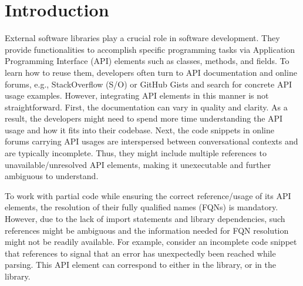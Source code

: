 \section{Introduction}
\label{sec:intro}

External software libraries play a crucial role in software development. They provide functionalities to accomplish specific programming tasks via Application Programming Interface (API) elements such as classes, methods, and fields. To learn how to reuse them, developers often turn to API documentation and online forums, e.g., StackOverflow (S/O) or GitHub Gists and search for concrete API usage examples. However, integrating API elements in this manner is not straightforward. First, the documentation can vary in quality and clarity. As a result, the developers might need to spend more time understanding the API usage and how it fits into their codebase. Next, the code snippets in online forums carrying API usages are interspersed between conversational contexts and are typically incomplete. Thus, they might include multiple references to unavailable/unresolved API elements, making it unexecutable and further ambiguous to understand.

To work with partial code while ensuring the correct reference/usage of its API elements, the resolution of their fully qualified names (FQNs) is mandatory. However, due to the lack of import statements and library dependencies, such references might be ambiguous and the information needed for FQN resolution might not be readily available. For example, consider an incomplete code snippet that references  to signal that an error has unexpectedly been reached while parsing. This API element can correspond to either  in the  library, or  in the  library. 

